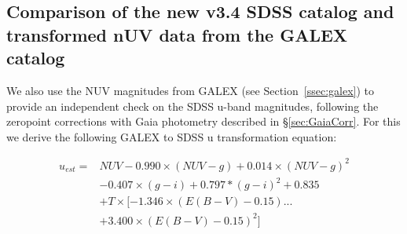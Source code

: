 \documentclass[fleqn,usenatbib]{mnras}
\begin{document}
\subsection{Comparison of the new v3.4 SDSS catalog and transformed nUV data from the GALEX catalog  \label{sec:Galextest}} 

We also use the NUV magnitudes from GALEX (see
Section~\ref{ssec:galex}) to provide an independent check on the SDSS
u-band magnitudes, following the zeropoint corrections with Gaia
photometry described in \S \ref{sec:GaiaCorr}. For this we derive the
following GALEX to SDSS u transformation equation:

\begin{equation}
\begin{split}
u_{est} = & NUV - 0.990\times(NUV - g) + 0.014\times(NUV  - g)^2  \\
         & -0.407\times(g - i) + 0.797*(g - i)^2 + 0.835  \\
         & + T \times [ -1.346\times(E(B-V)-0.15) ... \\
         & + 3.400\times(E(B-V)-0.15)^{2} ] \\
\end{split}
\end{equation}
\end{document}

